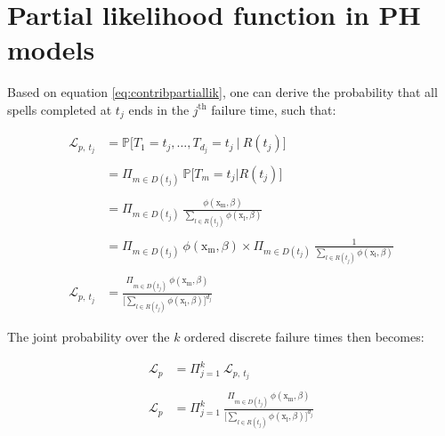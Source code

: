 \documentclass[
]{book}
\begin{document}
\hypertarget{partial-likelihood-function-in-ph-models}{%
\section*{Partial likelihood function in PH models}\label{partial-likelihood-function-in-ph-models}}

Based on equation \eqref{eq:contribpartiallik}, one can derive the probability that all spells completed at \(t_j\) ends in the \(j^{\text{th}}\) failure time, such that:

\begin{equation}
\begin{aligned}
  \mathcal{L}_{p,\ t_j} & = \mathbb{P}\big[T_1 = t_j, \dots, T_{d_j} = t_j \ | \ R(t_j)\big] \\\\
  & = \Pi_{m \in D(t_j)} \ \mathbb{P}\big[T_m = t_j | R(t_j) \big] \\\\
  & = \Pi_{m \in D(t_j)} \ \frac{\phi(\mathrm{x_m}, \beta)}{\sum_{l \in R(t_j)} \phi(\mathrm{x_l}, \beta)} \\\\
  & = \Pi_{m \in D(t_j)} \ \phi(\mathrm{x_m}, \beta) \times \Pi_{m \in D(t_j)} \ \frac{1}{\sum_{l \in R(t_j)} \phi(\mathrm{x_l}, \beta)} \\\\
  \mathcal{L}_{p,\ t_j} & = \frac{\Pi_{m \in D(t_j)} \ \phi(\mathrm{x_m}, \beta)}{\Big[\sum_{l \in R(t_j)} \phi(\mathrm{x_l}, \beta)\Big]^{d_j}}
\end{aligned}
\label{eq:partlikproof}
\end{equation}

The joint probability over the \(k\) ordered discrete failure times then becomes:

\begin{equation}
\begin{aligned}
  \mathcal{L}_p & = \Pi_{j=1}^{k} \ \mathcal{L}_{p,\ t_j} \\\\
  \mathcal{L}_p & = \Pi_{j=1}^{k} \ \frac{\Pi_{m \in D(t_j)} \ \phi(\mathrm{x_m}, \beta)}{\Big[\sum_{l \in R(t_j)} \phi(\mathrm{x_l}, \beta)\Big]^{d_j}}
\end{aligned}
\label{eq:partlikproofbis}
\end{equation}

  
\end{document}
